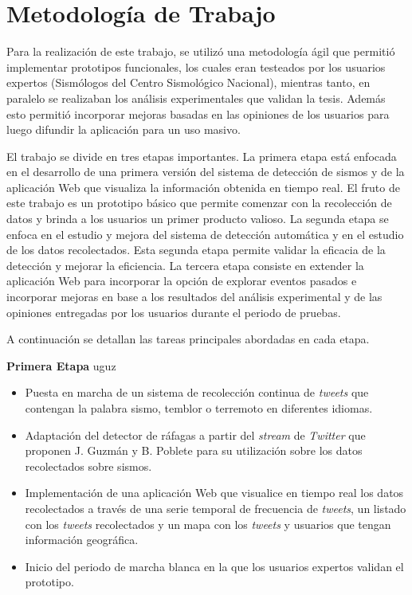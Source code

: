 \section{Metodología de Trabajo}

Para la realización de este trabajo, se utilizó una metodología ágil que permitió implementar prototipos funcionales, los cuales eran testeados por los usuarios expertos (Sismólogos del Centro Sismológico Nacional), mientras tanto, en paralelo se realizaban los análisis experimentales que validan la tesis. Además esto permitió incorporar mejoras basadas en las opiniones de los usuarios para luego difundir la aplicación para un uso masivo. 

El trabajo se divide en tres etapas importantes. La primera etapa está enfocada en el desarrollo de una primera versión del sistema de detección de sismos y de la aplicación Web que visualiza la información obtenida en tiempo real. El fruto de este trabajo es un prototipo básico que permite comenzar con la recolección de datos y brinda a los usuarios un primer producto valioso. La segunda etapa se enfoca en el estudio y mejora del sistema de detección automática y en el estudio de los datos recolectados. Esta segunda etapa permite validar la eficacia de la detección y mejorar la eficiencia. La tercera etapa consiste en extender la aplicación Web para incorporar la opción de explorar eventos pasados e incorporar mejoras en base a los resultados del análisis experimental y de las opiniones entregadas por los usuarios durante el periodo de pruebas.

A continuación se detallan las tareas principales abordadas en cada etapa.

\textbf{Primera Etapa}
uguz
\begin{itemize}

\item Puesta en marcha de un sistema de recolección continua de \textit{tweets} que contengan la palabra sismo, temblor o terremoto en diferentes idiomas. 
\item Adaptación del detector de ráfagas a partir del \textit{stream} de \textit{Twitter} que proponen J. Guzmán y B. Poblete \cite{guzman2013line} para su utilización sobre los datos recolectados sobre sismos.
\item Implementación de una aplicación Web que visualice en tiempo real los datos recolectados a través de una serie temporal de frecuencia de \textit{tweets}, un listado con los \textit{tweets} recolectados y un mapa con los \textit{tweets} y usuarios que tengan información geográfica.
\item Inicio del periodo de marcha blanca en la que los usuarios expertos validan el prototipo.

\end{itemize}

